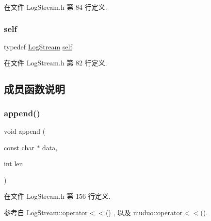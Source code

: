 在文件 Log\+Stream.\+h 第 84 行定义.

\mbox{\label{classmuduo_1_1LogStream_a85e87a809801549b949fc3f7f8c816bd}} 
\subsubsection{\texorpdfstring{self}{self}}
{\footnotesize\ttfamily typedef \hyperlink{classmuduo_1_1LogStream}{Log\+Stream} \hyperlink{classmuduo_1_1LogStream_a85e87a809801549b949fc3f7f8c816bd}{self}\hspace{0.3cm}{\ttfamily [private]}}



在文件 Log\+Stream.\+h 第 82 行定义.



\subsection{成员函数说明}
\mbox{\label{classmuduo_1_1LogStream_ad01a92f970117814c81b686b871558bc}} 
\subsubsection{\texorpdfstring{append()}{append()}}
{\footnotesize\ttfamily void append (\begin{DoxyParamCaption}\item[{const char $\ast$}]{data,  }\item[{int}]{len }\end{DoxyParamCaption})\hspace{0.3cm}{\ttfamily [inline]}}



在文件 Log\+Stream.\+h 第 156 行定义.



参考自 Log\+Stream\+::operator$<$$<$() , 以及 muduo\+::operator$<$$<$().

